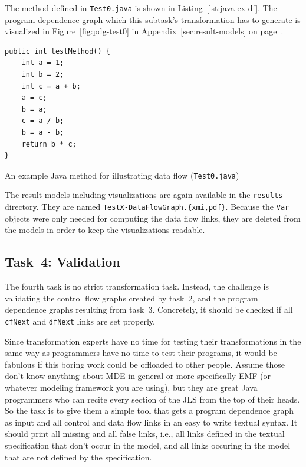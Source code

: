 \documentclass[11pt]{article}
\begin{document}
The method defined in \verb|Test0.java| is shown in
Listing~\ref{lst:java-ex-df}.  The program dependence graph which this
subtask's transformation has to generate is visualized in
Figure~\ref{fig:pdg-test0} in Appendix~\ref{sec:result-models} on
page~\pageref{fig:pdg-test0}.

\begin{listing}
  \begin{verbatim}
public int testMethod() {
    int a = 1;
    int b = 2;
    int c = a + b;
    a = c;
    b = a;
    c = a / b;
    b = a - b;
    return b * c;
}
  \end{verbatim}
  \caption{An example Java method for illustrating data flow
    (\texttt{Test0.java})}
  \label{lst:java-ex-df}
\end{listing}

The result models including visualizations are again available in the
\verb|results| directory.  They are named \verb|TestX-DataFlowGraph.{xmi,pdf}|.
Because the \verb|Var| objects were only needed for computing the data flow
links, they are deleted from the models in order to keep the visualizations
readable.


\subsection{Task~4: Validation}
\label{sec:task4-validation}

The fourth task is no strict transformation task.  Instead, the challenge is
validating the control flow graphs created by task~2, and the program
dependence graphs resulting from task~3.  Concretely, it should be checked if
all \verb|cfNext| and \verb|dfNext| links are set properly.

Since transformation experts have no time for testing their transformations in
the same way as programmers have no time to test their programs, it would be
fabulous if this boring work could be offloaded to other people.  Assume those
don't know anything about MDE in general or more specifically EMF (or whatever
modeling framework you are using), but they are great Java programmers who can
recite every section of the JLS \cite{Java7Spec} from the top of their heads.
So the task is to give them a simple tool that gets a program dependence graph
as input and all control and data flow links in an easy to write textual
syntax.  It should print all missing and all false links, i.e., all links
defined in the textual specification that don't occur in the model, and all
links occuring in the model that are not defined by the specification.
\end{document}
